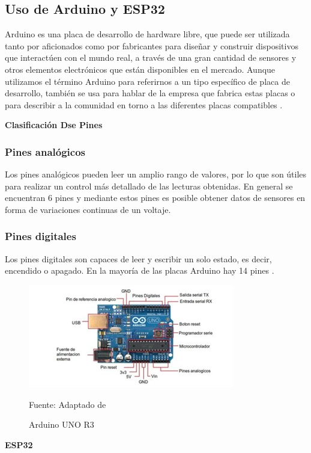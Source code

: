 \subsection{Uso de Arduino y ESP32}

Arduino es una placa de desarrollo de hardware libre, que puede ser utilizada tanto por aficionados como por fabricantes para diseñar y construir dispositivos que interactúen con el mundo real, a través de una gran cantidad de sensores y otros elementos electrónicos que están disponibles en el mercado. Aunque utilizamos el término Arduino para referirnos a un tipo específico de placa de desarrollo, también se usa para hablar de la empresa que fabrica estas placas o para describir a la comunidad en torno a las diferentes placas compatibles \cite{pena}.

\textbf{Clasificación Dse Pines}

\subsubsection{Pines analógicos}
Los pines analógicos pueden leer un amplio rango de valores, por lo que son útiles para realizar un control más detallado de las lecturas obtenidas. En general se encuentran 6 pines y mediante estos pines es posible obtener datos de sensores en forma de variaciones continuas de un voltaje. 

\subsubsection{Pines digitales}
Los pines digitales son capaces de leer y escribir un solo estado, es decir, encendido o apagado. En la mayoría de las placas Arduino hay 14 pines \cite{pena}.

\begin{figure}[H]
     \centering
     \includegraphics[scale = 0.97]{Imagenes/ardr3.jpg}
     \caption{Arduino UNO R3}{Fuente: Adaptado de ~\cite{mecafenix}}
\end{figure}

\textbf{ESP32}

